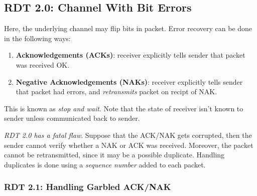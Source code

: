 \documentclass[twoside]{article}
\begin{document}
\subsection{RDT 2.0: Channel With Bit Errors}

Here, the underlying channel may flip bits in packet. Error recovery can be done in the following ways:

\begin{enumerate}
    \item \textbf{Acknowledgements (ACKs)}: receiver explicitly tells sender that packet was received OK.
    \item \textbf{Negative Acknowledgements (NAKs)}: receiver explicitly tells sender that packet had errors, and \emph{retransmits} packet on recipt of NAK.
\end{enumerate}

This is known as \emph{stop and wait}. Note that the state of receiver isn't known to sender unless communicated back to sender.

\emph{RDT 2.0 has a fatal flaw}. Suppose that the ACK/NAK gets corrupted, then the sender cannot verify whether a NAK or ACK was received. Moreover, the packet cannot be retransmitted, since it may be a possible duplicate. Handling duplicates is done using a \emph{sequence number} added to each packet.

\subsubsection{RDT 2.1: Handling Garbled ACK/NAK}
\end{document}
